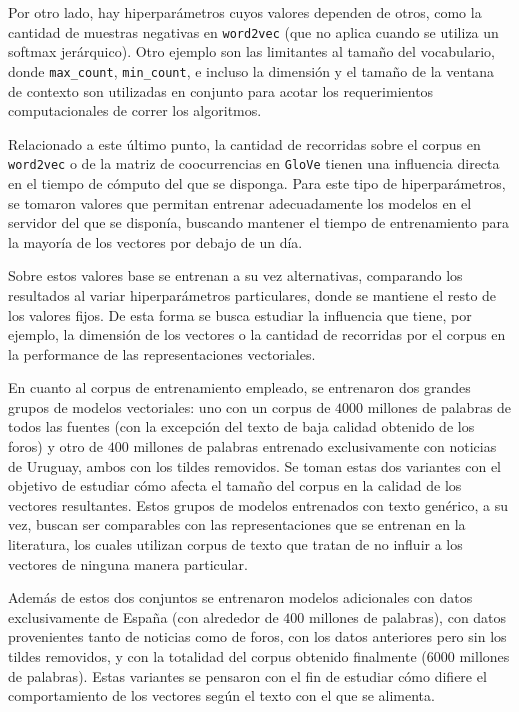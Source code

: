 Por otro lado, hay hiperparámetros cuyos valores dependen de otros, como la cantidad de muestras
negativas en \texttt{word2vec} (que no aplica cuando se utiliza un softmax jerárquico). Otro ejemplo
son las limitantes al tamaño del vocabulario, donde \texttt{max\_count}, \texttt{min\_count}, e
incluso la dimensión y el tamaño de la ventana de contexto son utilizadas en conjunto para acotar
los requerimientos computacionales de correr los algoritmos.

Relacionado a este último punto, la cantidad de recorridas sobre el corpus en \texttt{word2vec} o de
la matriz de coocurrencias en \texttt{GloVe} tienen una influencia directa en el tiempo de cómputo
del que se disponga. Para este tipo de hiperparámetros, se tomaron valores que permitan entrenar
adecuadamente los modelos en el servidor del que se disponía, buscando mantener el tiempo de
entrenamiento para la mayoría de los vectores por debajo de un día.

Sobre estos valores base se entrenan a su vez alternativas, comparando los resultados al variar
hiperparámetros particulares, donde se mantiene el resto de los valores fijos. De esta forma se
busca estudiar la influencia que tiene, por ejemplo, la dimensión de los vectores o la cantidad de
recorridas por el corpus en la performance de las representaciones vectoriales.


En cuanto al corpus de entrenamiento empleado, se entrenaron dos grandes grupos de modelos
vectoriales: uno con un corpus de $4000$ millones de palabras de todos las fuentes (con la excepción
del texto de baja calidad obtenido de los foros) y otro de $400$ millones de palabras entrenado
exclusivamente con noticias de Uruguay, ambos con los tildes removidos. Se toman estas dos variantes
con el objetivo de estudiar cómo afecta el tamaño del corpus en la calidad de los vectores
resultantes. Estos grupos de modelos entrenados con texto genérico, a su vez, buscan ser comparables
con las representaciones que se entrenan en la literatura, los cuales utilizan corpus de texto que
tratan de no influir a los vectores de ninguna manera particular.

Además de estos dos conjuntos se entrenaron modelos adicionales con datos exclusivamente de España
(con alrededor de $400$ millones de palabras), con datos provenientes tanto de noticias como de
foros, con los datos anteriores pero sin los tildes removidos, y con la totalidad del corpus
obtenido finalmente ($6000$ millones de palabras). Estas variantes se pensaron con el fin de
estudiar cómo difiere el comportamiento de los vectores según el texto con el que se alimenta.

